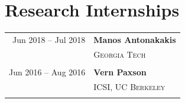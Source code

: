 \documentclass[10pt,singlecolumn]{article} %
\begin{document}

\section{Research Internships} 

\begin{tabular}{rl}
Jun 2018 -- Jul 2018 & \textbf{Manos Antonakakis}\\
& \textsc{Georgia Tech}\\
&\\

Jun 2016 -- Aug 2016 & \textbf{Vern Paxson}\\
& \textsc{ICSI, UC Berkeley}\\
& \\

\end{tabular}


%
%	
	
\end{document}
